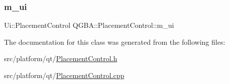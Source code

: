 \mbox{\label{class_q_g_b_a_1_1_placement_control_a7e1889bfb61d81fcb1a8896fb93c76a2}} 
\subsubsection{\texorpdfstring{m\+\_\+ui}{m\_ui}}
{\footnotesize\ttfamily Ui\+::\+Placement\+Control Q\+G\+B\+A\+::\+Placement\+Control\+::m\+\_\+ui\hspace{0.3cm}{\ttfamily [private]}}



The documentation for this class was generated from the following files\+:\begin{DoxyCompactItemize}
\item 
src/platform/qt/\mbox{\hyperlink{_placement_control_8h}{Placement\+Control.\+h}}\item 
src/platform/qt/\mbox{\hyperlink{_placement_control_8cpp}{Placement\+Control.\+cpp}}\end{DoxyCompactItemize}
